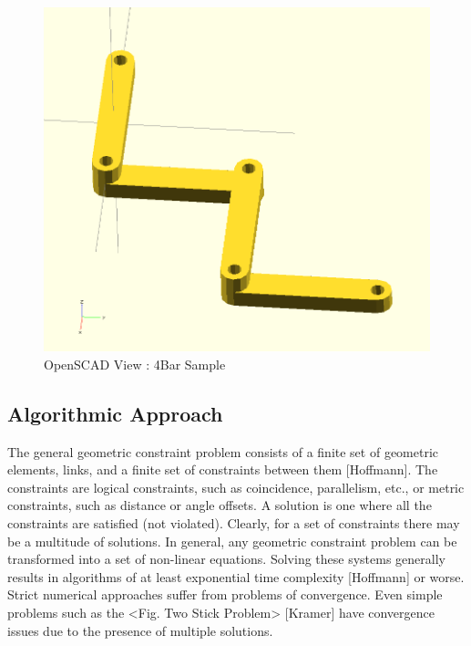 \documentclass[]{report}
\begin{document}
\begin{figure}[ht!]
	\centering
	\includegraphics[scale=0.5]{images/image12.png}
	\caption{OpenSCAD View : 4Bar Sample}
	\label{fig:4bar-openscad}
\end{figure}

\subsection{Algorithmic Approach}

The general geometric constraint problem consists of a finite set 
of geometric elements, links, and  a finite set of constraints between them [Hoffmann].  
The constraints are logical constraints, such as coincidence, parallelism, etc., 
or metric constraints, such as distance or angle offsets. 
A solution is one where all the constraints are satisfied (not violated). 
Clearly, for a set of constraints there may be a multitude of solutions. 
In general, any geometric constraint problem can be transformed into a set of non-linear equations. 
Solving these systems generally results in algorithms of 
at least exponential time complexity [Hoffmann] or worse. 
Strict numerical approaches suffer from problems of convergence.  
Even simple problems such as the <Fig. Two Stick Problem> [Kramer] 
have convergence issues due to the presence of multiple solutions. 
\end{document}
